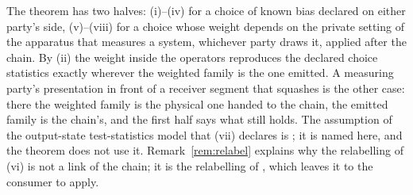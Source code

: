 
The theorem has two halves: (i)--(iv) for a choice of known bias declared on
either party's side, (v)--(viii) for a choice whose weight depends on the
private setting of the apparatus that measures a system, whichever party
draws it, applied after the chain. By (ii) the weight inside
the operators reproduces the declared choice statistics exactly wherever the
weighted family is the one emitted. A measuring party's presentation in front
of a receiver segment that squashes is the other case: there the weighted
family is the physical one handed to the chain, the emitted family is the
chain's, and the first half says what still holds. The
assumption of the output-state test-statistics model that (vii) declares is
; it is named here, and the theorem does not use it.
Remark~\ref{rem:relabel} explains
why the relabelling of (vi) is not a link of the chain; it is the relabelling
of , which leaves it to the consumer to
apply.

